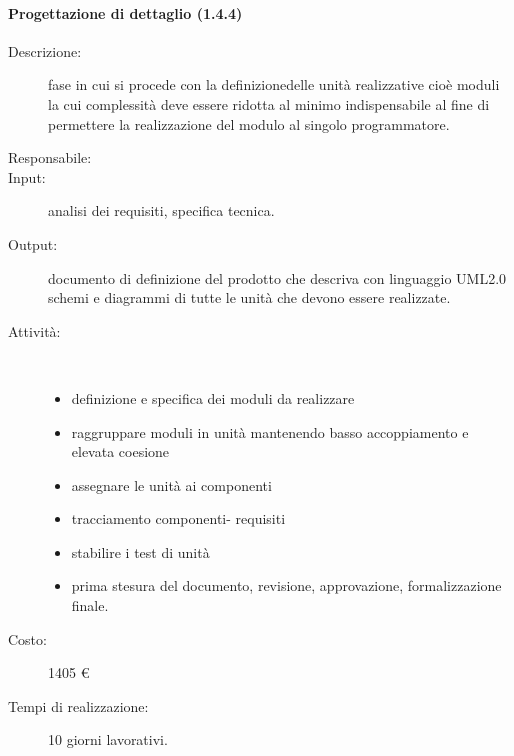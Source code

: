 \begin{description}
\paragraph{Progettazione di dettaglio (1.4.4)}
\begin{description}
\item[Descrizione:] fase in cui si procede con la definizionedelle unit\`{a} realizzative cio\`{e} moduli la cui complessit\`{a} deve essere ridotta al minimo indispensabile al fine di permettere la realizzazione del modulo al singolo programmatore.
\item[Responsabile:] 
\item[Input:] analisi dei requisiti, specifica tecnica.
\item[Output:] documento di definizione del prodotto che descriva con linguaggio UML2.0 schemi e diagrammi di tutte le unità che devono essere realizzate.
\item[Attività:]\mbox{}\\[-1.5\baselineskip]
	\begin{itemize}
	\item definizione e specifica dei moduli da realizzare
	\item raggruppare moduli in unità mantenendo basso accoppiamento e elevata coesione
	\item assegnare le unità ai componenti
	\item tracciamento componenti- requisiti
	\item stabilire i test di unità
	\item prima stesura del documento, revisione, approvazione, formalizzazione finale.
	\end{itemize}
\item[Costo:] 1405 \euro{}
\item[Tempi di realizzazione:] 10 giorni lavorativi.
\end{description}


\end{description}
